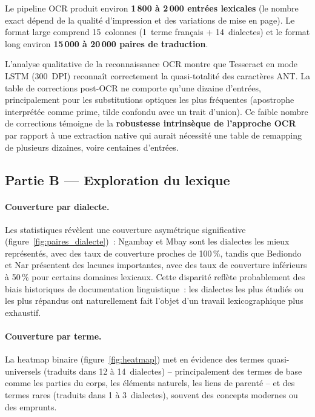 \documentclass[11pt, a4paper, oneside]{article}
\begin{document}
Le pipeline OCR produit environ \textbf{1\,800 à 2\,000 entrées lexicales} (le nombre exact dépend de la qualité d'impression et des variations de mise en page). Le format large comprend 15~colonnes (1~terme français + 14~dialectes) et le format long environ \textbf{15\,000 à 20\,000 paires de traduction}.

L'analyse qualitative de la reconnaissance OCR montre que Tesseract en mode LSTM (300~DPI) reconnaît correctement la quasi-totalité des caractères ANT. La table de corrections post-OCR ne comporte qu'une dizaine d'entrées, principalement pour les substitutions optiques les plus fréquentes (apostrophe interprétée comme prime, tilde confondu avec un trait d'union). Ce faible nombre de corrections témoigne de la \textbf{robustesse intrinsèque de l'approche OCR} par rapport à une extraction native qui aurait nécessité une table de remapping de plusieurs dizaines, voire centaines d'entrées.

\subsection{Partie B — Exploration du lexique}

\paragraph{Couverture par dialecte.} Les statistiques révèlent une couverture asymétrique significative (figure~\ref{fig:paires_dialecte})~: Ngambay et Mbay sont les dialectes les mieux représentés, avec des taux de couverture proches de 100\,\%, tandis que Bediondo et Nar présentent des lacunes importantes, avec des taux de couverture inférieurs à 50\,\% pour certains domaines lexicaux. Cette disparité reflète probablement des biais historiques de documentation linguistique~: les dialectes les plus étudiés ou les plus répandus ont naturellement fait l'objet d'un travail lexicographique plus exhaustif.

\paragraph{Couverture par terme.} La heatmap binaire (figure~\ref{fig:heatmap}) met en évidence des termes quasi-universels (traduits dans 12 à 14~dialectes) -- principalement des termes de base comme les parties du corps, les éléments naturels, les liens de parenté -- et des termes rares (traduits dans 1 à 3~dialectes), souvent des concepts modernes ou des emprunts.
\end{document}
